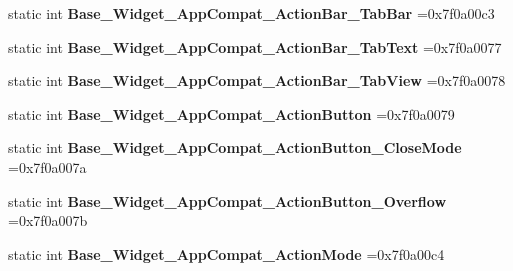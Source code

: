 \begin{DoxyCompactItemize}
\item 
\mbox{\label{classandroid_1_1support_1_1v7_1_1appcompat_1_1R_1_1style_a7d5020f6b3443097ed2324dd4e4dd2ba}} 
static int {\bfseries Base\+\_\+\+Widget\+\_\+\+App\+Compat\+\_\+\+Action\+Bar\+\_\+\+Tab\+Bar} =0x7f0a00c3
\item 
\mbox{\label{classandroid_1_1support_1_1v7_1_1appcompat_1_1R_1_1style_a7af82ab099a2b486394fac7d8058f263}} 
static int {\bfseries Base\+\_\+\+Widget\+\_\+\+App\+Compat\+\_\+\+Action\+Bar\+\_\+\+Tab\+Text} =0x7f0a0077
\item 
\mbox{\label{classandroid_1_1support_1_1v7_1_1appcompat_1_1R_1_1style_ace58a57bb501a7e68ccb9149d77aa360}} 
static int {\bfseries Base\+\_\+\+Widget\+\_\+\+App\+Compat\+\_\+\+Action\+Bar\+\_\+\+Tab\+View} =0x7f0a0078
\item 
\mbox{\label{classandroid_1_1support_1_1v7_1_1appcompat_1_1R_1_1style_a92ea4ff2a3712cb2aeb4eb8f18f9ca36}} 
static int {\bfseries Base\+\_\+\+Widget\+\_\+\+App\+Compat\+\_\+\+Action\+Button} =0x7f0a0079
\item 
\mbox{\label{classandroid_1_1support_1_1v7_1_1appcompat_1_1R_1_1style_a310ad6827e0659af53314e3406842b7f}} 
static int {\bfseries Base\+\_\+\+Widget\+\_\+\+App\+Compat\+\_\+\+Action\+Button\+\_\+\+Close\+Mode} =0x7f0a007a
\item 
\mbox{\label{classandroid_1_1support_1_1v7_1_1appcompat_1_1R_1_1style_afef19b14d5a9549d07b1f1f545653d78}} 
static int {\bfseries Base\+\_\+\+Widget\+\_\+\+App\+Compat\+\_\+\+Action\+Button\+\_\+\+Overflow} =0x7f0a007b
\item 
\mbox{\label{classandroid_1_1support_1_1v7_1_1appcompat_1_1R_1_1style_ac8d8ea855449c6b603249b2a9c6cc566}} 
static int {\bfseries Base\+\_\+\+Widget\+\_\+\+App\+Compat\+\_\+\+Action\+Mode} =0x7f0a00c4
\item 
\mbox{\label{classandroid_1_1support_1_1v7_1_1appcompat_1_1R_1_1style_afa05048dc70b3a0cada70f242f25b406}} 

\end{DoxyCompactItemize}
